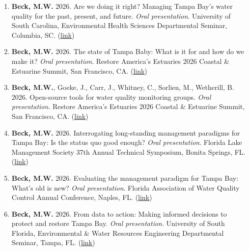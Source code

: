 \documentclass[letterpaper,12pt]{article}
\begin{document}
\begin{enumerate}

\item {\bf Beck, M.W.} 2026. Are we doing it right? Managing Tampa Bay's water quality for the past, present, and future. \textit{Oral presentation}. University of South Carolina, Environmental Health Sciences Departmental Seminar, Columbia, SC. ({\footnotesize\href{https://docs.google.com/presentation/d/1rSmtKU9BvTrfWgHJM-bACQcyZMnPcjHaqMfUablN-7g/edit?usp=sharing}{link}})

\item {\bf Beck, M.W.} 2026. The state of {T}ampa {B}aby: What is it for and how do we make it? \textit{Oral presentation}. Restore America's Estuaries 2026 Coastal \& Estuarine Summit, San Francisco, CA. ({\footnotesize\href{https://docs.google.com/presentation/d/1KEoK5SUl7gar2OoB9hJbjUX9iCTts0pg0TKXrha4MLA/edit?usp=sharing}{link}})

\item {\bf Beck, M.W.}, Goeke, J., Carr, J., Whitney, C., Sorlien, M., Wetherill, B. 2026. Open-source tools for water quality monitoring groups. \textit{Oral presentation}. Restore America's Estuaries 2026 Coastal \& Estuarine Summit, San Francisco, CA. ({\footnotesize\href{https://docs.google.com/presentation/d/1qC4tfbkkKjd9uHwx1YJEhlzWfUvY8Ilx/edit?usp=sharing&ouid=111030724967489561225&rtpof=true&sd=true}{link}})

\item {\bf Beck, M.W.} 2026. Interrogating long-standing management paradigms for Tampa Bay: Is the status quo good enough? \textit{Oral presentation}. Florida Lake Management Society 37th Annual Technical Symposium, Bonita Springs, FL. ({\footnotesize\href{https://docs.google.com/presentation/d/1xpe7q04KHqY3tUAAWXZwniF3f0w_T6MmJy5UwMfgx6I/edit?usp=drive_link}{link}})

\item {\bf Beck, M.W.} 2026. Evaluating the management paradigm for Tampa Bay: What's old is new? \textit{Oral presentation}. Florida Association of Water Quality Control Annual Conference, Naples, FL. ({\footnotesize\href{https://docs.google.com/presentation/d/1Buq_BkGJ1JYCqPPVYDPCFXO6LZLn2kH-aveQmizAu_U/edit?usp=drive_link}{link}})

\item {\bf Beck, M.W.} 2026. From data to action: Making informed decisions to protect and restore Tampa Bay. \textit{Oral presentation}. University of South Florida, Environmental \& Water Resources Engineering Departmental Seminar, Tampa, FL. ({\footnotesize\href{https://docs.google.com/presentation/d/1DfKkQU7s0_VTo7p3icq8zAt8iaZ9E1f7UUFsHmUiarw/edit?usp=sharing}{link}})


\end{enumerate}
\end{document}
